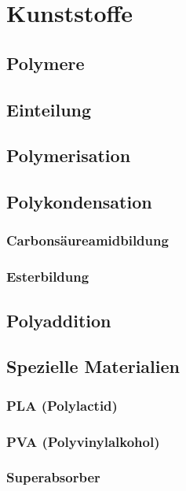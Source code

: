 \section{Kunststoffe}

\subsection{Polymere}

\subsection{Einteilung}


\subsection{Polymerisation}


\subsection{Polykondensation}


\subsubsection{Carbonsäureamidbildung}


\subsubsection{Esterbildung}


\subsection{Polyaddition}


\subsection{Spezielle Materialien}

\subsubsection{PLA (Polylactid)}

\subsubsection{PVA (Polyvinylalkohol)}

\subsubsection{Superabsorber}
